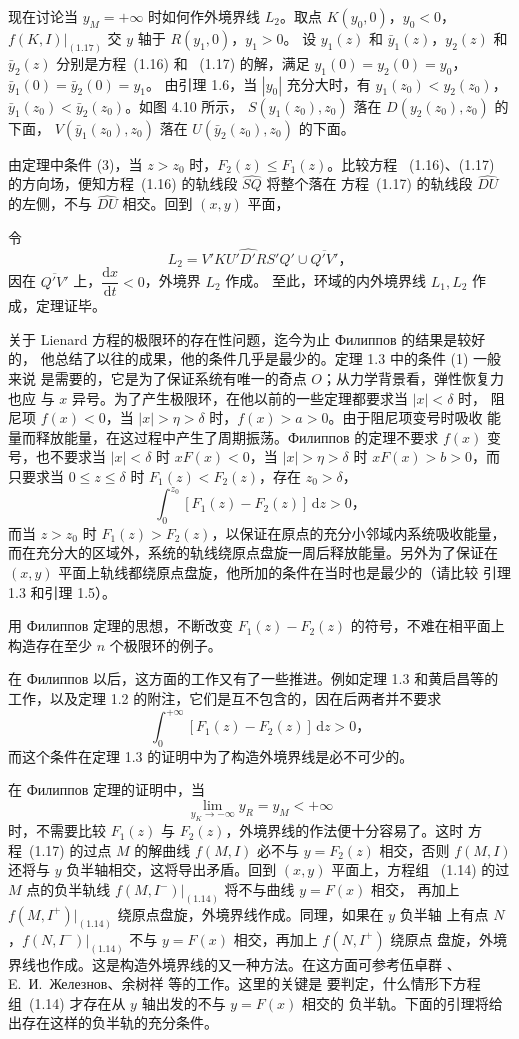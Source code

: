 现在讨论当 $y_M=+\infty$ 时如何作外境界线 $L_2$。取点
$K(y_0,0)$，$y_0<0$，$f(K,I)|_{(1.17)}$ 交 $y$ 轴于 $R(y_1,0)$，$y_1>0$。
设 $y_1(z)$ 和 $\bar y_1(z)$，$y_2(z)$ 和 $\bar y_2(z)$ 分别是方程~(1.16) 和
~(1.17) 的解，满足 $y_1(0)=y_2(0)=y_0$，$\bar y_1(0)=\bar y_2(0)=y_1$。
由引理 1.6，当 $|y_0|$ 充分大时，有 $y_1(z_0)<y_2(z_0)$，
$\bar y_1(z_0)<\bar y_2(z_0)$。如图 4.10 所示，
$S(y_1(z_0),z_0)$ 落在 $D(y_2(z_0),z_0)$ 的下面，
$V(\bar y_1(z_0),z_0)$ 落在 $U(\bar y_2(z_0),z_0)$ 的下面。

由定理中条件 (3)，当 $z>z_0$ 时，$F_2(z)\leq F_1(z)$。比较方程
~(1.16)、(1.17) 的方向场，便知方程~(1.16) 的轨线段 $\widehat{SQ}$ 将整个落在
方程~(1.17) 的轨线段 $\widehat{DU}$ 的左侧，不与 $\widehat{DU}$ 相交。回到
$(x,y)$ 平面，


令
\[
  L_2=\widehat{V'KU'D'RS'Q'}\cup\overline{Q'V'}，
\]
因在 $\overline{Q'V'}$ 上，$\dfrac{\mathrm{d}x}{\mathrm{d}t}<0$，外境界 $L_2$ 作成。
至此，环域的内外境界线 $L_1,L_2$ 作成，定理证毕。

关于 Lienard 方程的极限环的存在性问题，迄今为止 Филиппов 的结果是较好的，
他总结了以往的成果，他的条件几乎是最少的。定理 1.3 中的条件 (1) 一般来说
是需要的，它是为了保证系统有唯一的奇点 $O$；从力学背景看，弹性恢复力也应
与 $x$ 异号。为了产生极限环，在他以前的一些定理都要求当 $|x|<\delta$ 时，
阻尼项 $f(x)<0$，当 $|x|>\eta>\delta$ 时，$f(x)>a>0$。由于阻尼项变号时吸收
能量而释放能量，在这过程中产生了周期振荡。Филиппов 的定理不要求 $f(x)$
变号，也不要求当 $|x|<\delta$ 时 $xF(x)<0$，当 $|x|>\eta>\delta$ 时
$xF(x)>b>0$，而只要求当 $0\leq z\leq\delta$ 时 $F_1(z)<F_2(z)$，存在
$z_0>\delta$，
\[
  \int_0^{z_0}[F_1(z)-F_2(z)]\,\mathrm{d}z>0，
\]
而当 $z>z_0$ 时 $F_1(z)>F_2(z)$，以保证在原点的充分小邻域内系统吸收能量，
而在充分大的区域外，系统的轨线绕原点盘旋一周后释放能量。另外为了保证在
$(x,y)$ 平面上轨线都绕原点盘旋，他所加的条件在当时也是最少的（请比较
引理 1.3 和引理 1.5）。

用 Филиппов 定理的思想，不断改变 $F_1(z)-F_2(z)$ 的符号，不难在相平面上
构造存在至少 $n$ 个极限环的例子。

在 Филиппов 以后，这方面的工作又有了一些推进。例如定理 1.3 和黄启昌等的
工作\cite{11}，以及定理 1.2 的附注，它们是互不包含的，因在后两者并不要求
\[
  \int_0^{+\infty}[F_1(z)-F_2(z)]\,\mathrm{d}z>0，
\]
而这个条件在定理 1.3 的证明中为了构造外境界线是必不可少的。

在 Филиппов 定理的证明中，当
\[
  \lim_{y_K\to-\infty}y_R=y_M<+\infty
\]
时，不需要比较 $F_1(z)$ 与 $F_2(z)$，外境界线的作法便十分容易了。这时
方程~(1.17) 的过点 $M$ 的解曲线 $f(M,I)$ 必不与 $y=F_2(z)$ 相交，否则
$f(M,I)$ 还将与 $y$ 负半轴相交，这将导出矛盾。回到 $(x,y)$ 平面上，方程组
~(1.14) 的过 $M$ 点的负半轨线 $f(M,I^-)|_{(1.14)}$ 将不与曲线 $y=F(x)$ 相交，
再加上 $f(M,I^+)|_{(1.14)}$ 绕原点盘旋，外境界线作成。同理，如果在 $y$ 负半轴
上有点 $N$，$f(N,I^-)|_{(1.14)}$ 不与 $y=F(x)$ 相交，再加上 $f(N,I^+)$ 绕原点
盘旋，外境界线也作成。这是构造外境界线的又一种方法。在这方面可参考伍卓群
\cite{13}、E.~И.~Железнов\cite{14}、余树祥\cite{15,16} 等的工作。这里的关键是
要判定，什么情形下方程组~(1.14) 才存在从 $y$ 轴出发的不与 $y=F(x)$ 相交的
负半轨。下面的引理将给出存在这样的负半轨的充分条件。

